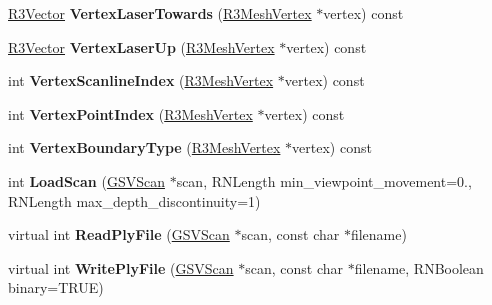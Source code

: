 \begin{DoxyCompactItemize}
\item 
\hyperlink{class_r3_vector}{R3\+Vector} {\bfseries Vertex\+Laser\+Towards} (\hyperlink{class_r3_mesh_vertex}{R3\+Mesh\+Vertex} $\ast$vertex) const \hypertarget{class_g_s_v_mesh_a528b086b605362d736e1ea71476fe008}{}\label{class_g_s_v_mesh_a528b086b605362d736e1ea71476fe008}

\item 
\hyperlink{class_r3_vector}{R3\+Vector} {\bfseries Vertex\+Laser\+Up} (\hyperlink{class_r3_mesh_vertex}{R3\+Mesh\+Vertex} $\ast$vertex) const \hypertarget{class_g_s_v_mesh_a7b2ade12d1f9b244fd6f0d42b0c6b2e1}{}\label{class_g_s_v_mesh_a7b2ade12d1f9b244fd6f0d42b0c6b2e1}

\item 
int {\bfseries Vertex\+Scanline\+Index} (\hyperlink{class_r3_mesh_vertex}{R3\+Mesh\+Vertex} $\ast$vertex) const \hypertarget{class_g_s_v_mesh_a5dfa68d12d34f6bb0452bcba92adb219}{}\label{class_g_s_v_mesh_a5dfa68d12d34f6bb0452bcba92adb219}

\item 
int {\bfseries Vertex\+Point\+Index} (\hyperlink{class_r3_mesh_vertex}{R3\+Mesh\+Vertex} $\ast$vertex) const \hypertarget{class_g_s_v_mesh_a534b9ebcd3c8792e2747536f335b0de0}{}\label{class_g_s_v_mesh_a534b9ebcd3c8792e2747536f335b0de0}

\item 
int {\bfseries Vertex\+Boundary\+Type} (\hyperlink{class_r3_mesh_vertex}{R3\+Mesh\+Vertex} $\ast$vertex) const \hypertarget{class_g_s_v_mesh_a78263085694901117ee084ad5e4b52c1}{}\label{class_g_s_v_mesh_a78263085694901117ee084ad5e4b52c1}

\item 
int {\bfseries Load\+Scan} (\hyperlink{class_g_s_v_scan}{G\+S\+V\+Scan} $\ast$scan, R\+N\+Length min\+\_\+viewpoint\+\_\+movement=0., R\+N\+Length max\+\_\+depth\+\_\+discontinuity=1)\hypertarget{class_g_s_v_mesh_af3b7a73b0e5f36ef106de1531f5f516d}{}\label{class_g_s_v_mesh_af3b7a73b0e5f36ef106de1531f5f516d}

\item 
virtual int {\bfseries Read\+Ply\+File} (\hyperlink{class_g_s_v_scan}{G\+S\+V\+Scan} $\ast$scan, const char $\ast$filename)\hypertarget{class_g_s_v_mesh_a3fae4ae5bbb3bd888da2251e953d4261}{}\label{class_g_s_v_mesh_a3fae4ae5bbb3bd888da2251e953d4261}

\item 
virtual int {\bfseries Write\+Ply\+File} (\hyperlink{class_g_s_v_scan}{G\+S\+V\+Scan} $\ast$scan, const char $\ast$filename, R\+N\+Boolean binary=T\+R\+UE)\hypertarget{class_g_s_v_mesh_a0783b16d93c397e4c8e18f3e54b7161b}{}\label{class_g_s_v_mesh_a0783b16d93c397e4c8e18f3e54b7161b}


\end{DoxyCompactItemize}

